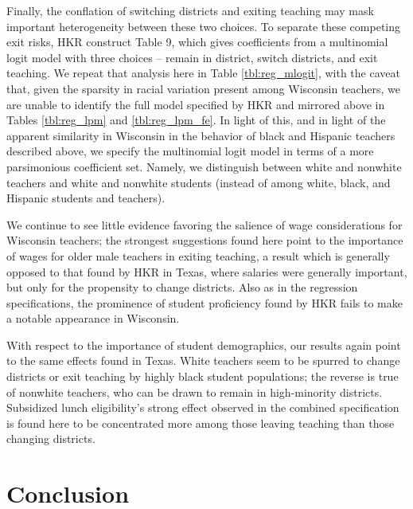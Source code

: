 \documentclass[12pt,]{article}
\newcommand{\TAG}[1]{}
\begin{document}
Finally, the conflation of switching districts and exiting teaching may
mask important heterogeneity between these two choices. To separate
these competing exit risks, HKR construct Table 9, which gives
coefficients from a multinomial logit model with three choices -- remain
in district, switch districts, and exit teaching. We repeat that
analysis here in Table \ref{tbl:reg_mlogit}, with the caveat that, given
the sparsity in racial variation present among Wisconsin teachers, we
are unable to identify the full model specified by HKR and mirrored
above in Tables \ref{tbl:reg_lpm} and \ref{tbl:reg_lpm_fe}. In light of
this, and in light of the apparent similarity in Wisconsin in the
behavior of black and Hispanic teachers described above, we specify the
multinomial logit model in terms of a more parsimonious coefficient set.
Namely, we distinguish between white and nonwhite teachers and white and
nonwhite students (instead of among white, black, and Hispanic students
and teachers).

We continue to see little evidence favoring the salience of wage
considerations for Wisconsin teachers; the strongest suggestions found
here point to the importance of wages for older male teachers in exiting
teaching, a result which is generally opposed to that found by HKR in
Texas, where salaries were generally important, but only for the
propensity to change districts. Also as in the regression
specifications, the prominence of student proficiency found by HKR fails
to make a notable appearance in Wisconsin.

With respect to the importance of student demographics, our results
again point to the same effects found in Texas. White teachers seem to
be spurred to change districts or exit teaching by highly black student
populations; the reverse is true of nonwhite teachers, who can be drawn
to remain in high-minority districts. Subsidized lunch eligibility's
strong effect observed in the combined specification is found here to be
concentrated more among those leaving teaching than those changing
districts.

\TAG{END_BODY}

\section{Conclusion}\label{conclusion}
\end{document}

